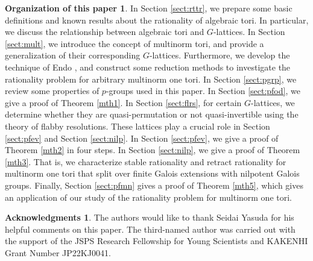 \documentclass[12pt]{amsart}
\theoremstyle{plain}
\theoremstyle{definition}
\newtheorem*{oftp}{Organization of this paper}
\newtheorem*{ack}{Acknowledgments}
\numberwithin{thm}{section}
\numberwithin{equation}{section}
\begin{document}
\begin{oftp}
In Section \ref{sect:rttr}, we prepare some basic definitions and known results about the rationality of algebraic tori. 
In particular, we discuss the relationship between algebraic tori and $G$-lattices.
In Section \ref{sect:mult}, we introduce the concept of multinorm tori, and provide a generalization of their corresponding $G$-lattices. 
Furthermore, we develop the technique of Endo \cite{Endo2011}, and construct some reduction methods to investigate the rationality problem for arbitrary multinorm one tori.
In Section \ref{sect:pgrp}, we review some properties of $p$-groups used in this paper.
In Section \ref{sect:pfod}, we give a proof of Theorem \ref{mth1}. 
In Section \ref{sect:flrs}, 
for certain $G$-lattices, we determine whether they are quasi-permutation or not quasi-invertible using the theory of flabby resolutions. 
These lattices play a crucial role in Section \ref{sect:pfev} and Section \ref{sect:nilp}.
In Section \ref{sect:pfev}, we give a proof of Theorem \ref{mth2} in four steps.
In Section \ref{sect:nilp}, we give a proof of Theorem \ref{mth3}. 
That is, we characterize stable rationality and retract rationality for multinorm one tori that split over finite Galois extensions with nilpotent Galois groups. 
Finally, Section \ref{sect:pfmn} gives a proof of Theorem \ref{mth5}, which gives an application of our study of the rationality problem for multinorm one tori. 
\end{oftp}

\begin{ack}
The authors would like to thank Seidai Yasuda for his helpful comments on this paper. The third-named author was carried out with the support of the JSPS Research Fellowship for Young Scientists and KAKENHI Grant Number JP22KJ0041.
\end{ack}
\end{document}
